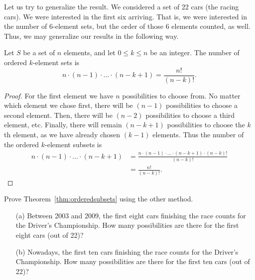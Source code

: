 Let us try to generalize the result. 
We considered a set of 22 cars (the racing cars). 
We were interested in the first six arriving. 
That is, we were interested in the number of 6-element sets, 
but the order of those 6 elements counted, as well. 
Thus, 
we may generalize our results in the following way. 

\begin{theorem}\label{thm:orderedsubsets}
Let $S$ be a set of $n$ elements, 
and let $0\leq k\leq n$ be an integer. 
The number of ordered $k$-element sets is
\[
n \cdot (n-1) \cdot \dots \cdot (n-k+1) = \frac{n!}{(n-k)!}. 
\]
\end{theorem}

\begin{proof}
For the first element we have $n$ possibilities to choose from. 
No matter which element we chose first, 
there will be $(n-1)$ possibilities to choose a second element. 
Then, there will be $(n-2)$ possibilities to choose a third element, etc. 
Finally, 
there will remain $(n-k+1)$ possibilities to choose the $k$th element, 
as we have already chosen $(k-1)$ elements. 
Thus the number of the ordered $k$-element subsets is
\begin{align*}
n \cdot (n-1) \cdot \dots \cdot (n-k+1) &= \frac{n \cdot (n-1) \cdot \dots \cdot (n-k+1) \cdot (n-k)!}{(n-k)!} \\
&= \frac{n!}{(n-k)!}. 
\end{align*}
\end{proof}

\begin{exercise}\label{ex:orderedsubsets}
Prove Theorem~\ref{thm:orderedsubsets} using the other method. 
\end{exercise}

\begin{exercise}\label{ex:forma1}
\begin{enumerate}
\item[(a)]
Between 2003 and 2009, 
the first eight cars finishing the race counts for the Driver's Championship. 
How many possibilities are there for the first eight cars (out of 22)? 

\item[(b)]
Nowadays, 
the first ten cars finishing the race counts for the Driver's Championship. 
How many possibilities are there for the first ten cars (out of 22)? 
\end{enumerate}
\end{exercise}

